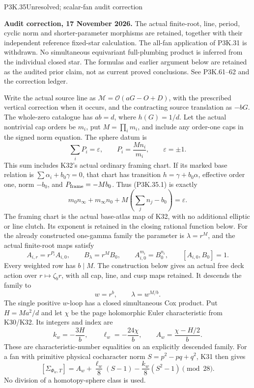\begin{statement}{P3K.35}{Unresolved; scalar-fan audit correction}
\par\noindent\textbf{Audit correction, 17 November 2026.} The actual finite-root, line, period, cyclic norm and shorter-parameter morphisms are retained, together with their independent reference fixed-star calculation. The all-fan application of P3K.31 is withdrawn. No simultaneous equivariant full-plumbing product is inferred from the individual closed star. The formulas and earlier argument below are retained as the audited prior claim, not as current proved conclusions. See P3K.61--62 and the correction ledger.
\medskip

Write the actual source line as
\(\mathcal M=\mathcal O(aG-O+D)\), with the prescribed vertical
correction when it occurs, and the contracting source translation as
\(-bG\). The whole-zero catalogue has \(ab=d\), where \(h(G)=1/d\).
Let the actual nontrivial cap orders be \(m_i\), put
\(M=\prod_i m_i\), and include any order-one caps in the signed
norm equation. The sphere datum is
\[
           \sum_i P_i=\varepsilon,\qquad
           P_i=\frac{M n_i}{m_i},\qquad \varepsilon=\pm1.
                                                               \tag{P3K.35.1}
\]
This sum includes K32's actual ordinary framing chart. If its marked
base relation is \(\sum\alpha_i+b_0\gamma=0\), that chart has
transition \(h=\gamma+b_0\alpha\), effective order one, norm
\(-b_0\), and \(P_{\rm frame}=-Mb_0\). Thus (P3K.35.1) is exactly
\[
 m_0n_\infty+m_\infty n_0
                +M\left(\sum_jn_j-b_0\right)=\varepsilon.
\]
The framing chart is the actual base-atlas map of K32, with no
additional elliptic or line clutch. Its exponent is retained in
the closing rational function below.
For the already constructed one-gamma family the parameter is
\(\lambda=r^M\), and the actual finite-root maps satisfy
\[
 A_{i,r}=r^{P_i}A_{i,0},\qquad B_\lambda=r^M B_0,
 \qquad A_{i,0}^{m_i}=B_0^{n_i},\qquad[A_{i,0},B_0]=1.
                                                               \tag{P3K.35.2}
\]
Every weighted row has \(b\mid M\). The construction below gives
an actual free deck action over \(r\mapsto\zeta_b r\), with all
cap, line, and cusp maps retained. It descends the family to
\[
                     w=r^b,\qquad \lambda=w^{M/b}.       \tag{P3K.35.3}
\]
The single positive \(w\)-loop has a closed simultaneous Cox product.
Put \(H=Ma^2/d\) and let \(\chi\) be the page holomorphic Euler
characteristic from K30/K32. Its integers and index are
\[
 k_w=-\frac{3H}{b},\qquad
 \ell_w=-\frac{24\chi}{b},\qquad
 A_w=\frac{\chi-H/2}{b}.                              \tag{P3K.35.4}
\]
These are characteristic-number equalities on an explicitly descended
family. For a fan with primitive physical cocharacter norm
\(S=p^2-pq+q^2\), K31 then gives
\[
 [\Sigma_{\Phi_w,T}]
      =A_w+\frac{\ell_w}{8}(S-1)
                   -\frac{k_w}{8}(S^2-1)\pmod {28}.     \tag{P3K.35.5}
\]
No division of a homotopy-sphere class is used.
\end{statement}
